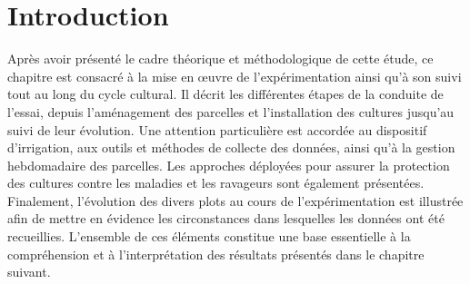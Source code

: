 \section{Introduction}
Après avoir présenté le cadre théorique et méthodologique de cette étude, ce chapitre est consacré à la mise en œuvre de l’expérimentation ainsi qu’à son suivi tout au long du cycle cultural. Il décrit les différentes étapes de la conduite de l’essai, depuis l’aménagement des parcelles et l’installation des cultures jusqu’au suivi de leur évolution. Une attention particulière est accordée au dispositif d’irrigation, aux outils et méthodes de collecte des données, ainsi qu’à la gestion hebdomadaire des parcelles. Les approches déployées pour assurer la protection des cultures contre les maladies et les ravageurs sont également présentées. Finalement, l’évolution des divers plots au cours de l’expérimentation est illustrée afin de mettre en évidence les circonstances dans lesquelles les données ont été recueillies. L'ensemble de ces éléments constitue une base essentielle à la compréhension et à l'interprétation des résultats présentés dans le chapitre suivant.